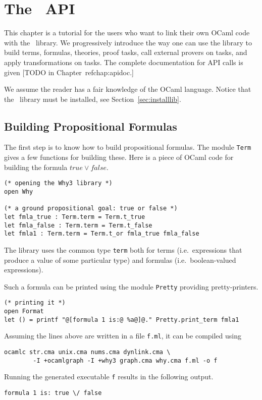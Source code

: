 \chapter{The \why\ API}
\label{chap:api}

This chapter is a tutorial for the users who want to link their own
OCaml code with the \why\ library. We progressively introduce the way
one can use the library to build terms, formulas, theories, proof
tasks, call external provers on tasks, and apply transformations on
tasks. The complete documentation for API calls is given
[TODO in Chapter~ref{chap:apidoc}.]

We assume the reader has a fair knowledge of the OCaml
language. Notice that the \why\ library must be installed,
see Section~\ref{sec:installlib}.


\section{Building Propositional Formulas}

The first step is to know how to build propositional formulas. The
module \texttt{Term} gives a few functions for building these. Here is
a piece of OCaml code for building the formula $true \lor false$.
\begin{verbatim}
(* opening the Why3 library *)
open Why

(* a ground propositional goal: true or false *)
let fmla_true : Term.term = Term.t_true
let fmla_false : Term.term = Term.t_false
let fmla1 : Term.term = Term.t_or fmla_true fmla_false
\end{verbatim}
The library uses the common type \texttt{term} both for terms
(i.e.~expressions that produce a value of some particular type)
and formulas (i.e.~boolean-valued expressions).

Such a formula can be printed using the module \texttt{Pretty}
providing pretty-printers.
\begin{verbatim}
(* printing it *)
open Format
let () = printf "@[formula 1 is:@ %a@]@." Pretty.print_term fmla1
\end{verbatim}

Assuming the lines above are written in a file \texttt{f.ml}, it can
be compiled using
\begin{verbatim}
ocamlc str.cma unix.cma nums.cma dynlink.cma \
        -I +ocamlgraph -I +why3 graph.cma why.cma f.ml -o f
\end{verbatim}
Running the generated executable \texttt{f} results in the following output.
\begin{verbatim}
formula 1 is: true \/ false
\end{verbatim}


